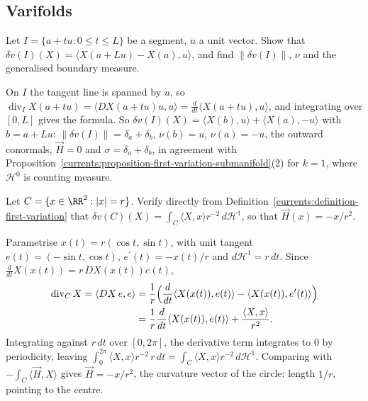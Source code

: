 \subsection{Varifolds}\label{currents:subsection-exercises-varifolds}

\begin{exercise}\label{currents:exercise-segment}
Let $I = \{a + tu : 0 \leq t \leq L\}$ be a segment, $u$ a unit vector. Show that $\delta v(I)(X) = \langle X(a + Lu) - X(a), u\rangle$, and find $\|\delta v(I)\|$, $\nu$ and the generalised boundary measure.
\end{exercise}

\begin{solution}
On $I$ the tangent line is spanned by $u$, so $\operatorname{div}_IX(a + tu) = \langle DX(a + tu)u, u\rangle = \frac{d}{dt}\langle X(a + tu), u\rangle$, and integrating over $[0, L]$ gives the formula. So
$\delta v(I)(X) = \langle X(b), u\rangle + \langle X(a), -u\rangle$ with $b = a + Lu$: $\|\delta v(I)\| = \delta_a + \delta_b$, $\nu(b) = u$, $\nu(a) = -u$, the outward conormals, $\vec{H} = 0$ and $\sigma = \delta_a + \delta_b$,
in agreement with Proposition~\ref{currents:proposition-first-variation-submanifold}(2) for $k = 1$, where $\mathcal{H}^0$ is counting measure.
\end{solution}

\begin{exercise}\label{currents:exercise-circle}
Let $C = \{x \in \RR^2 : |x| = r\}$. Verify directly from Definition~\ref{currents:definition-first-variation} that $\delta v(C)(X) = \int_C\langle X, x\rangle r^{-2}\,d\mathcal{H}^1$, so that $\vec{H}(x) = -x/r^2$.
\end{exercise}

\begin{solution}
Parametrise $x(t) = r(\cos t, \sin t)$, with unit tangent $e(t) = (-\sin t, \cos t)$, $e^{\prime}(t) = -x(t)/r$ and $d\mathcal{H}^1 = r\,dt$. Since $\frac{d}{dt}X(x(t)) = r\,DX(x(t))e(t)$,
\[
\begin{aligned}
\operatorname{div}_CX = \langle DX\,e, e\rangle &= \frac1r\Bigl(\frac{d}{dt}\langle X(x(t)), e(t)\rangle - \langle X(x(t)), e^{\prime}(t)\rangle\Bigr) \\
&= \frac1r\frac{d}{dt}\langle X(x(t)), e(t)\rangle + \frac{\langle X, x\rangle}{r^2} .
\end{aligned}
\]
Integrating against $r\,dt$ over $[0, 2\pi]$, the derivative term integrates to $0$ by periodicity, leaving $\int_0^{2\pi}\langle X, x\rangle r^{-2}\,r\,dt = \int_C\langle X, x\rangle r^{-2}\,d\mathcal{H}^1$.
Comparing with $-\int_C\langle\vec{H}, X\rangle$ gives $\vec{H} = -x/r^2$, the curvature vector of the circle: length $1/r$, pointing to the centre.
\end{solution}

